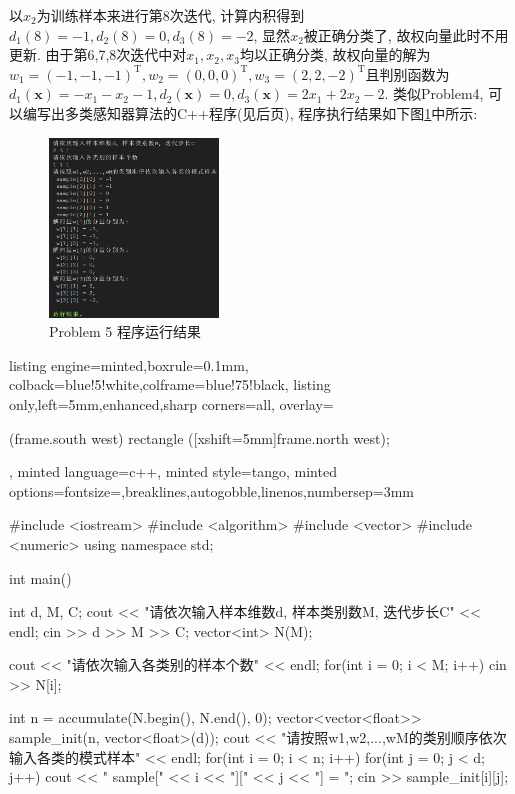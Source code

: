 \documentclass{article}
\begin{document}
\begin{homeworkProblem}
	以$x_2$为训练样本来进行第8次迭代, 计算内积得到$d_1(8)=-1, d_2(8)=0, d_3(8)=-2$, 显然$x_2$被正确分类了, 故权向量此时不用更新. 由于第6,7,8次迭代中对$x_1,x_2,x_3$均以正确分类, 故权向量的解为$w_1=\left( -1,-1,-1 \right) ^{\mathrm{T}},w_2=\left( 0,0,0 \right) ^{\mathrm{T}},w_3=\left( 2,2,-2 \right) ^{\mathrm{T}}$且判别函数为$d_1\left( \boldsymbol{x} \right) =-x_1-x_2-1, d_2\left( \boldsymbol{x} \right) =0, d_3\left( \boldsymbol{x} \right) =2x_1+2x_2-2$. 类似Problem4, 可以编写出多类感知器算法的C++程序(见后页), 程序执行结果如下图\ref{fig:P5程序运行结果}中所示:
	\begin{figure}[H]  %
		\centering
		\includegraphics[width=0.4\textwidth]{images/title/作业题5-代码结果.png}
		\caption{Problem 5 程序运行结果}
		\label{fig:P5程序运行结果}
	\end{figure}
\begin{tcblisting}{listing engine=minted,boxrule=0.1mm,
colback=blue!5!white,colframe=blue!75!black,
listing only,left=5mm,enhanced,sharp corners=all,
overlay={\begin{tcbclipinterior} (frame.south west)
rectangle ([xshift=5mm]frame.north west);\end{tcbclipinterior}},
minted language=c++,
minted style=tango,
minted options={fontsize=\small,breaklines,autogobble,linenos,numbersep=3mm}}
#include <iostream>
#include <algorithm>
#include <vector>
#include <numeric>
using namespace std;

int main() {
    int d, M, C;
    cout << "请依次输入样本维数d, 样本类别数M, 迭代步长C" << endl;
    cin >> d >> M >> C;
    vector<int> N(M);

    cout << "请依次输入各类别的样本个数" << endl;
    for(int i = 0; i < M; i++) {
        cin >> N[i];
    }

    int n = accumulate(N.begin(), N.end(), 0);
    vector<vector<float>> sample_init(n, vector<float>(d));
    cout << "请按照w1,w2,...,wM的类别顺序依次输入各类的模式样本" << endl;
    for(int i = 0; i < n; i++) {
        for(int j = 0; j < d; j++) {
            cout << " sample[" << i << "][" << j << "] = ";
            cin >> sample_init[i][j];
        }
    }
    
}
\end{tcblisting}
\end{homeworkProblem}
\end{document}
